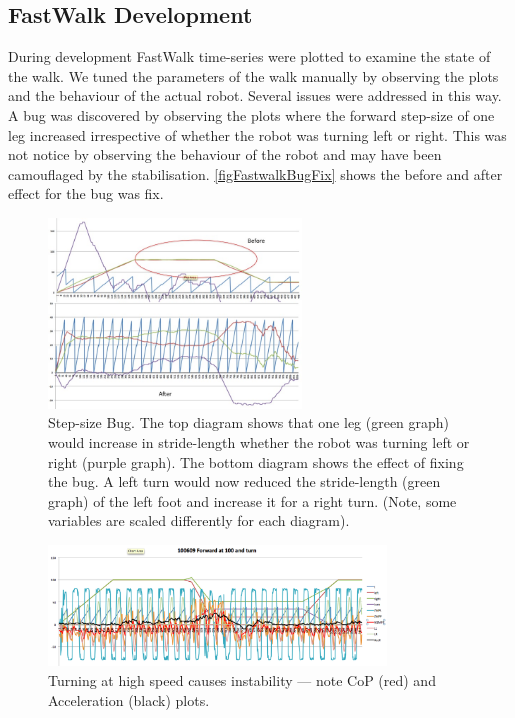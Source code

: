 \documentclass[pdftex,11pt,a4paper]{report}
\begin{document}
\subsection{FastWalk Development}
During development FastWalk time-series were plotted to examine the state of  the walk. We tuned the parameters of the walk manually by observing the plots and the behaviour of the actual robot. Several issues were addressed in this way. A bug was discovered by observing the plots where the forward step-size of one leg increased irrespective of whether the robot was turning left or right. This was not notice by observing the behaviour of the robot and may have been camouflaged by the stabilisation. \autoref{figFastwalkBugFix}  shows the before and after effect for the bug was fix. 

\begin{figure}[ht]
\centering
\includegraphics[width=0.6\textwidth]{figures/FastwalkBugFix}
\caption{Step-size Bug. The top diagram shows that one leg (green graph) would increase in stride-length whether the robot was turning left or right (purple graph). The bottom diagram shows the effect of fixing the bug. A left turn would now reduced the stride-length (green graph) of the left foot and increase it for a right turn. (Note, some variables are scaled differently for each diagram).} \label{figFastwalkBugFix}
\end{figure} 

\begin{figure}[ht]
\centering
\includegraphics[width=0.8\textwidth]{figures/FastwalkTurnAtHighSpeedBefore}
\caption{Turning at high speed causes instability --- note CoP (red) and Acceleration (black) plots.} \label{figFastwalkTurnAtHighSpeedBefore}
\end{figure} 
\end{document}
